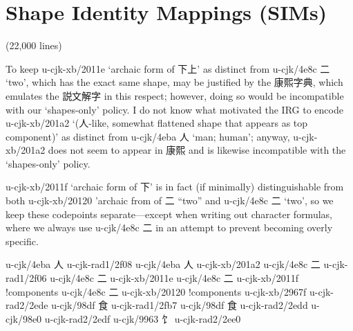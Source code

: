 \section{Shape Identity Mappings (SIMs)
}
\begin{multicols}{2}(22,000 lines)\mktsShowpar\par
To keep u-cjk-xb/2011e { }‘archaic form of {\cjk{}下上}’ as distinct from
u-cjk/4e8c {\cjk{}二} ‘two’, which has the
exact same shape, may be justified by the {\cjk{}康熙字典}, which
emulates the {\cjk{}説文解字} in this respect; however, doing
so would be incompatible with our ‘shapes-only’ policy. I do not know
what motivated the IRG to encode u-cjk-xb/201a2 { }‘({\cjk{}人}-like, somewhat
flattened shape that appears as top component)’ as distinct from u-cjk/4eba {\cjk{}人}
‘man; human’; anyway, u-cjk-xb/201a2 { }does not seem to appear in {\cjk{}康熙} and
is likewise incompatible with the ‘shapes-only’ policy.\mktsShowpar\par
u-cjk-xb/2011f { }‘archaic form of {\cjk{}下}’ is in fact (if minimally)
distinguishable from both u-cjk-xb/20120 { }'archaic from of {\cjk{}二} “two”
and u-cjk/4e8c {\cjk{}二} ‘two’, so we keep these codepoints separate—except
when writing out character formulas, where we always use u-cjk/4e8c {\cjk{}二}
in an attempt to prevent becoming overly specific.\mktsShowpar\par
\begingroup\mktsStyleCode{}\begingroup\mktsObeyAllLines{}u-cjk/4eba	{\cjk{}人}	u-cjk-rad1/2f08	{} 
u-cjk/4eba	{\cjk{}人}	u-cjk-xb/201a2	{} 
u-cjk/4e8c	{\cjk{}二}	u-cjk-rad1/2f06	{} 
u-cjk/4e8c	{\cjk{}二}	u-cjk-xb/2011e	{} 
u-cjk/4e8c	{\cjk{}二}	u-cjk-xb/2011f	{}!components 
u-cjk/4e8c	{\cjk{}二}	u-cjk-xb/20120	{}!components 
\endgroup{}\endgroup{}\begingroup\mktsStyleCode{}\begingroup\mktsObeyAllLines{}u-cjk-xb/2967f	{	}u-cjk-rad2/2ede	{} 
u-cjk/98df	{\cjk{}食}	u-cjk-rad1/2fb7	{} 
u-cjk/98df	{\cjk{}食}	u-cjk-rad2/2edd	{} 
u-cjk/98e0	{\cjk{}}	u-cjk-rad2/2edf	{} 
u-cjk/9963	{\cjk{}饣}	u-cjk-rad2/2ee0	{} 

\end{multicols}
